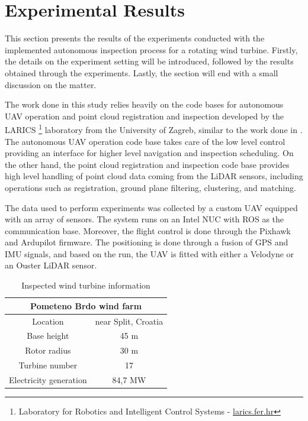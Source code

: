 \section{Experimental Results} \label{sec:experimental_results}

This section presents the results of the experiments conducted with the implemented autonomous inspection process for a rotating wind turbine. Firstly, the details on the experiment setting will be introduced, followed by the results obtained through the experiments. Lastly, the section will end with a small discussion on the matter.

The work done in this study relies heavily on the code bases for autonomous UAV operation and point cloud registration and inspection developed by the LARICS \footnote{Laboratory for Robotics and Intelligent Control Systems - \hyperlink{https://larics.fer.hr/}{larics.fer.hr}} laboratory from the University of Zagreb, similar to the work done in \cite{ref:Car2020}. The autonomous UAV operation code base takes care of the low level control providing an interface for higher level navigation and inspection scheduling. On the other hand, the point cloud registration and inspection code base provides high level handling of point cloud data coming from the LiDAR sensors, including operations such as registration, ground plane filtering, clustering, and matching.

The data used to perform experiments was collected by a custom UAV equipped with an array of sensors. The system runs on an Intel NUC with ROS as the communication base. Moreover, the flight control is done through the Pixhawk and Ardupilot firmware. The positioning is done through a fusion of GPS and IMU signals, and based on the run, the UAV is fitted with either a Velodyne or an Ouster LiDAR sensor.

\begin{table}[H]
    \centering
    \begin{tabular}{||c|c||}
    \hline
     \multicolumn{2}{||c||}{Pometeno Brdo wind farm} \\
     \hline
    \hline
        Location & near Split, Croatia \\
    \hline
        Base height & 45 m \\
    \hline
        Rotor radius & 30 m \\
    \hline
        Turbine number & 17 \\
    \hline
        Electricity generation & 84,7 MW \\
    \hline
    \end{tabular}
    \caption{Inspected wind turbine information}
    \label{tab:turbine_info}
\end{table}

